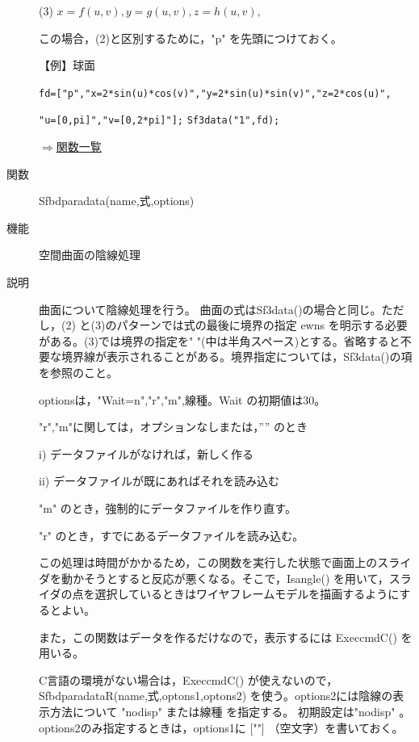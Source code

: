 \documentclass[papersize,a4paper,12pt,uplatex]{jsarticle}
\begin{document}
\begin{description}
  \begin{center}     \end{center}

(3) $x=f(u,v),y=g(u,v),z=h(u,v),$

  この場合，(2)と区別するために，"p" を先頭につけておく。
  
 \vspace{\baselineskip}
 【例】球面
 
 \verb|fd=["p","x=2*sin(u)*cos(v)","y=2*sin(u)*sin(v)","z=2*cos(u)",|
    
\verb|"u=[0,pi]","v=[0,2*pi]"];|
\verb|Sf3data("1",fd);|

\begin{center}  \end{center}

\begin{flushright} \hyperlink{functionlist}{$\Rightarrow$関数一覧}\end{flushright}

\hypertarget{sfbdparadata}{}
\item[関数]  Sfbdparadata(name,式,options)
\item[機能]  空間曲面の陰線処理
\item[説明]  曲面について陰線処理を行う。
  曲面の式はSf3data()の場合と同じ。ただし，(2) と(3)のパターンでは式の最後に境界の指定 ewns を明示する必要がある。(3)では境界の指定を" "(中は半角スペース)とする。省略すると不要な境界線が表示されることがある。境界指定については，Sf3data()の項を参照のこと。
  
optionsは，"Wait=n","r","m",線種。Wait の初期値は30。

 "r","m"に関しては，オプションなしまたは，”” のとき
 
  i) データファイルがなければ，新しく作る
  
  ii) データファイルが既にあればそれを読み込む
  
"m"  のとき，強制的にデータファイルを作り直す。

"r" のとき，すでにあるデータファイルを読み込む。

この処理は時間がかかるため，この関数を実行した状態で画面上のスライダを動かそうとすると反応が悪くなる。そこで，Isangle() を用いて，スライダの点を選択しているときはワイヤフレームモデルを描画するようにするとよい。

また，この関数はデータを作るだけなので，表示するには ExeccmdC() を用いる。

C言語の環境がない場合は，ExeccmdC() が使えないので，SfbdparadataR(name,式,optons1,optons2) を使う。options2には陰線の表示方法について "nodisp" または線種 を指定する。 初期設定は"nodisp" 。options2のみ指定するときは，options1に [""] （空文字）を書いておく。


\end{description}
\end{document}
